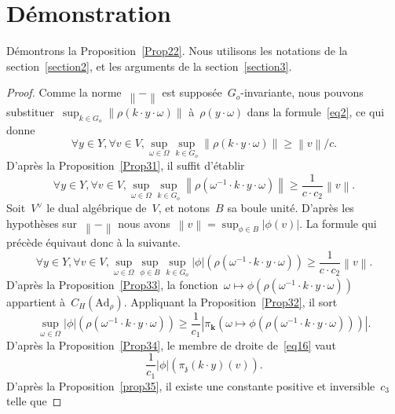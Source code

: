 \documentclass[french]{amsart}
\newcommand{\kk}{\mathbf{k}}
\newcommand{\abs}[1]{{\left|{#1}\right|}}
\newcommand{\Ad}{\mathrm{Ad}}
\newcommand{\lie}[1]{{\mathfrak{#1}}}
\newcommand{\Nm}[1]{{\left\|{#1}\right\|}}
\newcommand{\z}{\lie{z}}
\begin{document}
\section{Démonstration}\label{section4}
Démontrons la Proposition~\ref{Prop22}. Nous utilisons les notations de la section~\ref{section2}, et
les arguments de la section~\ref{section3}.
\begin{proof}
Comme la norme~$\Nm{-}$ est supposée~$G_o$-invariante, nous pouvons sub\-sti\-tuer~$\sup_{k\in G_o}\Nm{\rho(k\cdot y\cdot \omega)}$ à~$\rho(y\cdot \omega)$ dans la formule~\eqref{eq2}, ce qui donne
\begin{equation}\label{eq13}
\forall y\in Y, \forall v\in V, \sup_{\omega\in\Omega}\sup_{k\in G_o}\Nm{\rho(k\cdot y\cdot \omega)}\geq \Nm{v}/c.
\end{equation}
D'après la Proposition~\ref{Prop31}, il suffit d'établir
\begin{equation}\label{eq14}
\forall y\in Y, \forall v\in V, \sup_{\omega\in\Omega}\sup_{k\in G_o}\Nm{\rho(\omega^{-1}\cdot k\cdot y\cdot \omega)}\geq\frac{1}{c\cdot c_2} \Nm{v}.
\end{equation}
Soit~$V^\vee$ le dual algébrique de~$V$, et notons~$B$ sa boule unité.
D'après les hypothèses sur~$\Nm{-}$ 
nous avons~$\Nm{v}=\sup_{\phi\in B}\abs{\phi(v)}$. La formule qui précède équivaut donc à la suivante.
\begin{equation}\label{eq15}
\forall y\in Y, \forall v\in V, \sup_{\omega\in\Omega}\sup_{\phi\in B}\sup_{k\in G_o}\abs{\phi}\left(\rho(\omega^{-1}\cdot k\cdot y\cdot \omega)\right)\geq\frac{1}{c\cdot c_2} \Nm{v}.
\end{equation}
D'après la Proposition~\ref{Prop33}, la fonction~$\omega\mapsto {\phi}\left(\rho(\omega^{-1}\cdot k\cdot y\cdot \omega)\right)$ appartient à~$C_H(\Ad_\rho)$. Appliquant la Proposition~\ref{Prop32}, il sort
\begin{equation}\label{eq16}
 \sup_{\omega\in\Omega}\abs{\phi}\left(\rho(\omega^{-1}\cdot k\cdot y\cdot \omega)\right)
 	\geq
\frac{1}{c_1}
	\abs{
		\pi_{\kk}
		\left(
			\omega
				\mapsto
			{\phi}\left(\rho(\omega^{-1}\cdot k\cdot y\cdot \omega)\right)
		\right)
		}.
\end{equation}
D'après la Proposition~\ref{Prop34}, le membre de droite de~\eqref{eq16} vaut
\begin{equation}\label{eq17}
\frac{1}{c_1}\abs{\phi}(\pi_{\z}(k\cdot y)(v)).
\end{equation}
D'après la Proposition~\ref{prop35}, il existe une constante positive et inversible~$c_3$ telle que

\end{proof}
\end{document}
